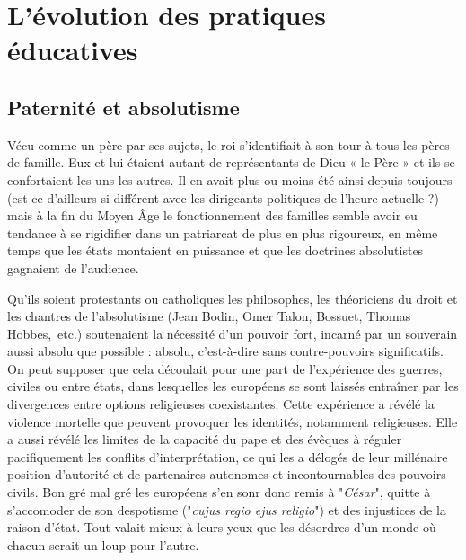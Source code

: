 
\chapter{L'évolution des pratiques éducatives}


 \section{Paternité et absolutisme}


Vécu comme un père par ses sujets, le roi s'identifiait à son tour à tous les pères de famille. Eux et lui étaient autant de représentants de Dieu « le Père » et ils se confortaient les uns les autres. Il en avait plus ou moins été ainsi depuis toujours (est-ce d'ailleurs si différent avec les dirigeants politiques de l'heure actuelle ?) mais à la fin du Moyen Âge le fonctionnement des familles semble avoir eu tendance à se rigidifier dans un patriarcat de plus en plus rigoureux, en même temps que les états montaient en puissance et que les doctrines absolutistes gagnaient de l'audience. 

Qu'ils soient protestants ou catholiques les philosophes, les théoriciens du droit et les chantres de l'absolutisme (Jean Bodin, Omer Talon, Bossuet, Thomas Hobbes,~etc.) soutenaient la nécessité d'un pouvoir fort, incarné par un souverain aussi absolu que possible : absolu, c'est-à-dire sans contre-pouvoirs significatifs. On peut supposer que cela découlait pour une part de l'expérience des guerres, civiles ou entre états, dans lesquelles les européens se sont laissés entraîner par les divergences entre options religieuses coexistantes. Cette expérience a révélé la violence mortelle que peuvent provoquer les identités, notamment religieuses. Elle a aussi révélé les limites de la capacité du pape et des évêques à réguler pacifiquement les conflits d'interprétation, ce qui les a délogés de leur millénaire position d'autorité et de partenaires autonomes et incontournables des pouvoirs civils. Bon gré mal gré les européens s'en sonr donc remis à "\emph{César}", quitte à s'accomoder de son despotisme ("\emph{cujus regio ejus religio}") et des injustices de la raison d'état. Tout valait mieux à leurs yeux que les désordres d'un monde où chacun serait un loup pour l'autre. 

